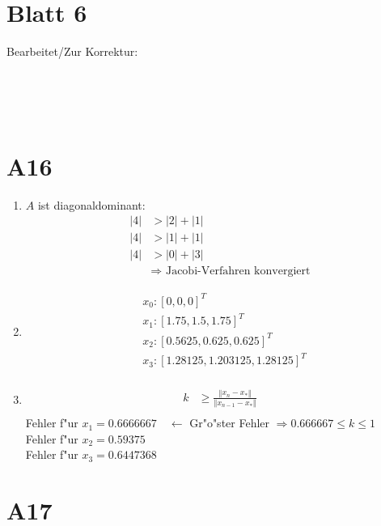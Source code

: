 \documentclass[fleqn,12pt]{scrartcl}
\newcommand{\abs}[1]{
	\left \vert #1 \right \vert
}
\newcommand{\absbb}[1]{
	\left \Vert #1 \right \Vert
}
\newcommand{\blattn}{Blatt 6}
\begin{document}
\section*{\blattn}
Bearbeitet/Zur Korrektur:

\noindent
\begin{Form}
	\\
	\\
	\\
\end{Form}

\section*{A16}
\begin{enumerate}
	\item
		$A$ ist diagonaldominant:
		\begin{align*}
			\abs{4} &> \abs{2} + \abs{1}\\
			\abs{4} &> \abs{1} + \abs{1}\\
			\abs{4} &> \abs{0} + \abs{3}\\
										&\Rightarrow \text{ Jacobi-Verfahren konvergiert}
		\end{align*}
	\item

		\begin{align*}
			&x_0: [0, 0, 0]^T\\
	 &x_1: 
[ 1.75 , 1.5  , 1.75]^T\\
&x_2: 
[ 0.5625,  0.625  , 0.625 ]^T\\
&x_3: 
[ 1.28125 ,  1.203125 , 1.28125 ]^T\\
		\end{align*}
	\item
		\begin{align*}
			k &\geq \frac{\absbb{x_n - x_*}}{\absbb{x_{n-1} - x_*}}\\
		\end{align*}
		Fehler f"ur $x_1 = 0.6666667 \quad \leftarrow $ Gr"o"ster Fehler $\Rightarrow 0.666667 \leq k \leq 1$ \\
		Fehler f"ur $x_2 = 0.59375$\\
		Fehler f"ur $x_3 = 0.6447368$\\

\end{enumerate}
\section*{A17}
\end{document}
